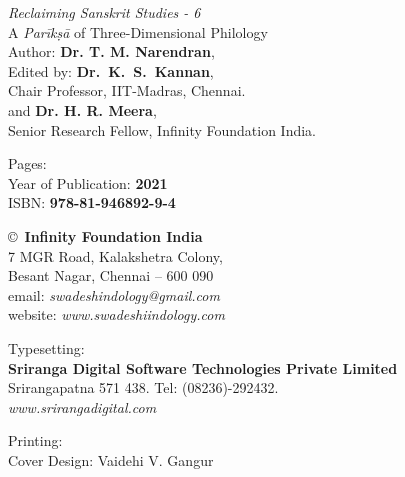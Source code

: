 \thispagestyle{empty}

\noindent
{\fontsize{9}{11}\selectfont\sl Reclaiming Sanskrit Studies - 6}\\
A \textit{Parīkṣā} of Three-Dimensional Philology\\
Author: {\bf Dr. T. M. Narendran},\\
Edited by: {\bf Dr.\ K.~S.~Kannan},\\
Chair Professor, IIT-Madras, Chennai.\\
and {\bf Dr. H. R. Meera},\\
Senior Research Fellow, Infinity Foundation India.\\
\vfill

\noindent
Pages: {\bf\pageref{bookend}}\\
Year of Publication: {\bf 2021}\\
ISBN: {\bf 978-81-946892-9-4}\\

\vfill

\noindent
\copyright\ {\bf Infinity Foundation India}\\ 
7 MGR Road, Kalakshetra Colony,\\ 
Besant Nagar, Chennai -- 600 090\\
email: {\sl swadeshindology@gmail.com}\\
website: {\sl www.swadeshiindology.com} 
\vfill

\noindent
Typesetting:\\ 
{\bf Sriranga Digital Software Technologies Private Limited}\\ 
Srirangapatna 571 438. Tel: (08236)-292432.\\
{\sl www.srirangadigital.com}
\vfill

\noindent
Printing:\\

\noindent
Cover Design: Vaidehi V. Gangur\\ 
